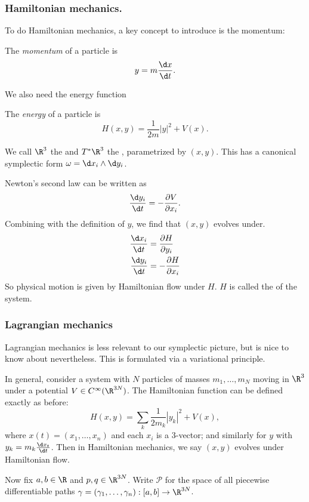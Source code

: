\documentclass[a4paper]{article}
\begin{document}
\subsubsection*{Hamiltonian mechanics.}
To do Hamiltonian mechanics, a key concept to introduce is the momentum:
\begin{defi}[Momentum]
  The \emph{momentum} of a particle is
  \[
    y = m \frac{\d x}{\d t}.
  \]
\end{defi}
We also need the energy function
\begin{defi}[Energy]
  The \emph{energy} of a particle is
  \[
    H(x, y) = \frac{1}{2m} |y|^2 + V(x).
  \]
\end{defi}
We call $\R^3$ the  and $T^* \R^3$ the , parametrized by $(x, y)$. This has a canonical symplectic form $\omega = \d x_i \wedge \d y_i$.

Newton's second law can be written as
\[
  \frac{\d y_i}{\d t} = - \frac{\partial V}{\partial x_i}.
\]
Combining with the definition of $y$, we find that $(x, y)$ evolves under.
\begin{align*}
  \frac{\d x_i}{\d t} &= \frac{\partial H}{\partial y_i}\\
  \frac{\d y_i}{\d t} &= -\frac{\partial H}{\partial x_i}
\end{align*}
So physical motion is given by Hamiltonian flow under $H$. $H$ is called the  of the system.

\subsubsection*{Lagrangian mechanics}
Lagrangian mechanics is less relevant to our symplectic picture, but is nice to know about nevertheless. This is formulated via a variational principle.

In general, consider a system with $N$ particles of masses $m_1, \ldots, m_N$ moving in $\R^3$ under a potential $V \in C^\infty(\R^{3N})$. The Hamiltonian function can be defined exactly as before:
\[
  H(x, y) = \sum_k \frac{1}{2m_k} |y_k|^2 + V(x),
\]
where $x(t) = (x_1, \ldots, x_n)$ and each $x_i$ is a $3$-vector; and similarly for $y$ with $y_k = m_k \frac{\d x_t}{\d t}$. Then in Hamiltonian mechanics, we say $(x, y)$ evolves under Hamiltonian flow.

Now fix $a, b \in \R$ and $p, q \in \R^{3N}$. Write $\mathcal{P}$ for the space of all piecewise differentiable paths $\gamma = (\gamma_1, \ldots, \gamma_n): [a, b] \to \R^{3N}$.
\end{document}
